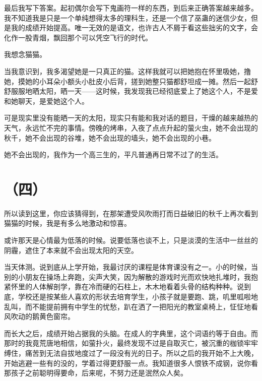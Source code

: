 \documentclass{article}
\begin{document}
最后我写下答案。起初偶尔会写下鬼画符一样的东西，到后来正确答案越来越多。我不知道我是只是一个单纯想得太多的理科生，还是一个信了巫蛊的迷信少女，但是我的成绩开始提高。唯一无效的是语文，也许古人不屑于看这些拙劣的文字，会化作一股青烟，飘回那个可以凭空飞行的时代。



我想念猫猫。



当我意识到，我多渴望她是一只真正的猫。这样我就可以把她抱在怀里吸她，撸她，摸她的小耳朵小额头小肚皮小后背，搓到她整只猫都舒坦成一摊。然后一起舒舒服服地晒太阳，晒一天——这时候，我发现我已经彻底爱上了她这个人，不是爱和她聊天，是爱她这个人。



可是现实里没有能晒一天的太阳，现实只有能和我对话的题目，干燥的越来越热的天气，永远忙不完的事情。傍晚的烤串，入夜了点点升起的萤火虫，她不会出现的秋千，她不会出现的谷堆，她不会出现的墙头，她不会出现的小巷。



她不会出现的，我作为一个高三生的，平凡普通再日常不过了的生活。





{\centering\section*{（四）}}





所以读到这里，你应该猜得到，在那架遭受风吹雨打而日益破旧的秋千上再次看到猫猫的时候，我是有多么地激动和惊喜。



或许那天是心情最为低落的时候。说要低落也谈不上，只是淡漠的生活中一丝丝的阴霾，遮住了本来就不会出现太阳的天空。



当天体测。说到底从上学开始，我最讨厌的课程是体育课没有之一。小的时候，当别的小朋友在操场上奔跑，尖声大笑，因为解散的游戏时光而欢快地扎堆时，我抱紧怀里的人体解剖学，靠在冷而硬的石柱上，木木地看着头骨的结构种种。说到底，学校还是按某些人喜欢的形状去培育学生，小孩子就是要跑、跳，叽里呱啦地乱叫，而不能提前拥有中学生的忧愁，趴在洒了一把阳光的教室桌椅上，怔怔地看风吹动的鹅黄色窗帘。



而长大之后，成绩开始占据我的头脑。在成人的字典里，这个词语约等于自由。而那时的我竟荒唐地相信，如萤扑火，最终发现不过是自取灭亡，被沉重的枷锁牢牢缚住，痛苦到无法自拔地度过了一段没有光的日子。所以之后的我开始不上大晚，开始逃避一些有的没的，学着过得更舒服一点。我知道很多人恨铁不成钢，说你看那孩子之前聪明得要命，后来呢，不努力还是泯然众人矣。
\end{document}

